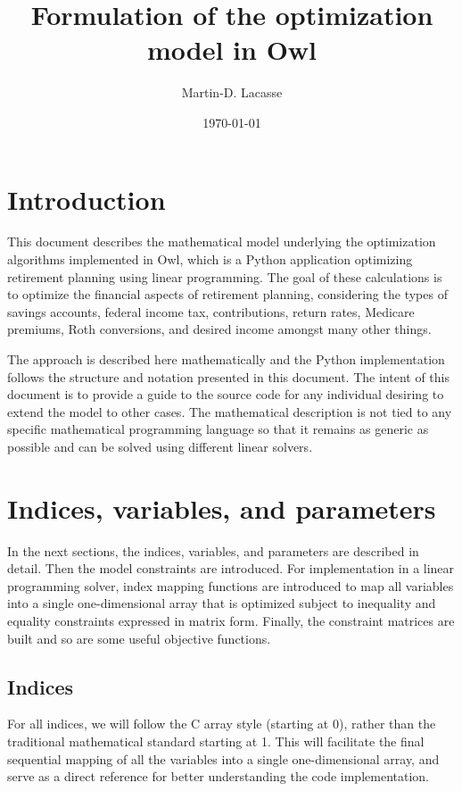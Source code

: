 \documentclass{report}[fleqn,12pt]
\begin{document}
\title{Formulation of the optimization model in Owl}
\author{Martin-D. Lacasse}
\date{\today}
\maketitle
\thispagestyle{fancy}
\fancyhead{}

\chapter{Introduction}
This document describes the mathematical model underlying
the optimization algorithms implemented in
Owl, which is a Python application optimizing retirement
planning using linear programming. The goal of
these calculations is to optimize the financial aspects
of retirement planning, considering the types of savings accounts,
federal income tax, contributions, return rates, Medicare premiums, Roth conversions,
and desired income amongst many other things.

The approach is described here mathematically and the Python implementation
follows the structure and notation presented in this document.
The intent of this document is to provide a guide to the source code
for any individual desiring to extend the model to other cases.
The mathematical description is not tied to any specific mathematical
programming language so that it remains as generic as possible and
can be solved using different linear solvers.

\chapter{Indices, variables, and parameters}
In the next sections, the indices, variables, and parameters are
described in detail. Then the model constraints are introduced.
For implementation in a linear programming solver, index mapping
functions are introduced to map all variables into a single
one-dimensional array that
is optimized subject to inequality and equality constraints
expressed in matrix form. Finally, the constraint matrices are built
and so are some useful objective functions.

\section{Indices}
For all indices, we will follow the C array style (starting at 0),
rather than the traditional mathematical standard starting at 1.
This will facilitate the final
sequential mapping of all the variables into a single one-dimensional array,
and serve as a direct reference for better understanding the code implementation.
\end{document}
